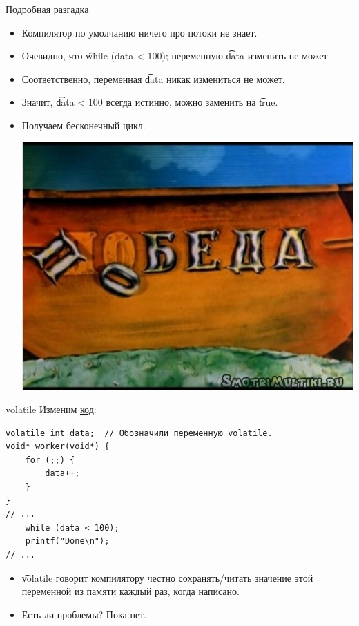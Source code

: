 \begin{frame}{Подробная разгадка}
	\begin{itemize}
		\item Компилятор по умолчанию ничего про потоки не знает.
		\item Очевидно, что \t{while (data < 100);} переменную \t{data} изменить не может.
		\item Соответственно, переменная \t{data} никак измениться не может.
		\item Значит, \t{data < 100} всегда истинно, можно заменить на \t{true}.
		\item Получаем бесконечный цикл.
			\begin{center}
				\includegraphics[scale=0.3]{win-lose.jpg}
			\end{center}
	\end{itemize}
\end{frame}

\begin{frame}[fragile]{volatile}
	Изменим \href{https://raw.githubusercontent.com/yeputons/spring-2019-paradigms/master/190410/sources/13-volatile.cpp}{код}:
\begin{verbatim}
volatile int data;  // Обозначили переменную volatile.
void* worker(void*) {
    for (;;) {
        data++;
    }
}
// ...
    while (data < 100);
    printf("Done\n");
// ...
\end{verbatim}
	\begin{itemize}
		\item \t{volatile} говорит компилятору честно сохранять/читать значение этой переменной из памяти каждый раз, когда написано.
		\item Есть ли проблемы? \pause Пока нет.
	\end{itemize}
\end{frame}

